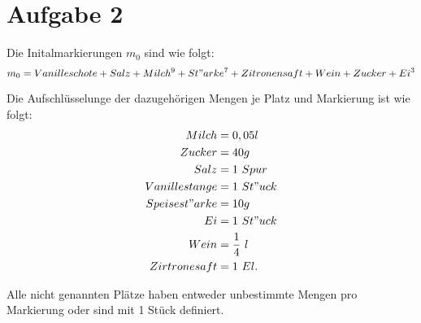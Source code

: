 \section*{Aufgabe 2} %
\label{sec:aufgabe_2}
Die Initalmarkierungen $m_0$ sind wie folgt:
\begin{equation*}
	m_0 = Vanilleschote + Salz + Milch^9 + St"arke^7 + Zitronensaft + Wein + Zucker + Ei^3 
\end{equation*}

Die Aufschlüsselunge der dazugehörigen Mengen je Platz und Markierung ist wie folgt:
\begin{align*}
	Milch &= 0,05l\\
    Zucker &= 40g\\
    Salz &= 1\ Spur\\
    Vanillestange &= 1\ St"uck\\
    Speisest"arke &= 10g\\
    Ei &= 1\ St"uck\\
    Wein &= \frac{1}{4}\ l\\
    Zirtronesaft &= 1\ El.\\
\end{align*}

Alle nicht genannten Plätze haben entweder unbestimmte Mengen pro Markierung oder sind mit 1 Stück definiert.

